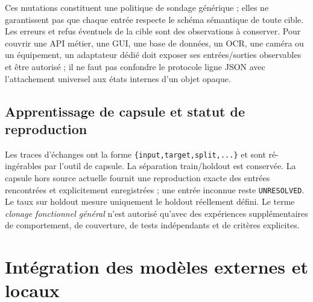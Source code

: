 \documentclass[11pt,a4paper]{article}
\begin{document}
Ces mutations constituent une politique de sondage générique ; elles ne garantissent pas que chaque entrée respecte le schéma sémantique de toute cible. Les erreurs et refus éventuels de la cible sont des observations à conserver. Pour couvrir une API métier, une GUI, une base de données, un OCR, une caméra ou un équipement, un adaptateur dédié doit exposer ses entrées/sorties observables et être autorisé ; il ne faut pas confondre le protocole ligne JSON avec l'attachement universel aux états internes d'un objet opaque.

\subsection{Apprentissage de capsule et statut de reproduction}
Les traces d'échanges ont la forme \verb|{input,target,split,...}| et sont ré-ingérables par l'outil de capsule. La séparation train/holdout est conservée. La capsule hors source actuelle fournit une reproduction exacte des entrées rencontrées et explicitement enregistrées ; une entrée inconnue reste \verb|UNRESOLVED|. Le taux sur holdout mesure uniquement le holdout réellement défini. Le terme \emph{clonage fonctionnel général} n'est autorisé qu'avec des expériences supplémentaires de comportement, de couverture, de tests indépendants et de critères explicites.

\section{Intégration des modèles externes et locaux}
\end{document}
